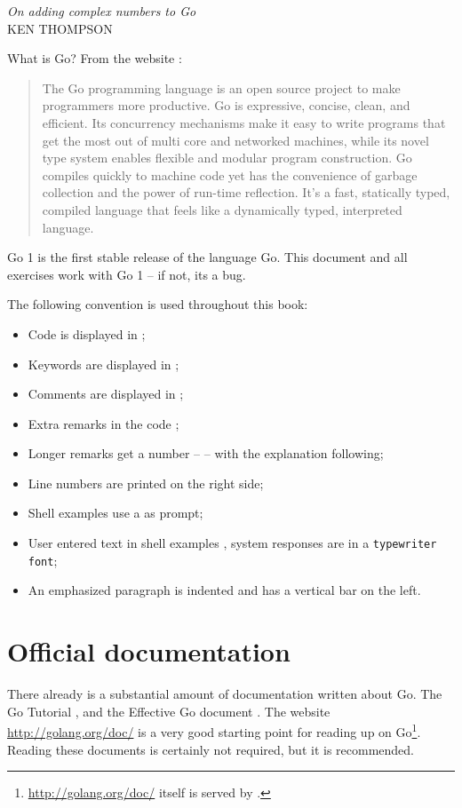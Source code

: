 {\textit{On adding complex numbers to Go}\\ \textsc{KEN THOMPSON}}

\noindent{}What is Go? From the website \cite{go_web}:
\begin{quote}
The Go programming language is an open source project to make
programmers more productive. Go is expressive, concise, clean, and
efficient. Its concurrency mechanisms make it easy to write programs
that get the most out of multi core and networked machines, while its
novel type system enables flexible and modular program construction. Go
compiles quickly to machine code yet has the convenience of garbage
collection and the power of run-time reflection. It's a fast, statically
typed, compiled language that feels like a dynamically typed,
interpreted language.
\end{quote}

Go 1 is the first stable release of the language Go. 
This document and all exercises work with Go 1 -- if not, its
a bug.

The following convention is used throughout this book:
\begin{itemize}
\item Code is displayed in ;
\item Keywords are displayed in ;
\item Comments are displayed in ;
\item Extra remarks in the code ;
\item Longer remarks get a number --  -- with the explanation following;
\item Line numbers are printed on the right side;
\item Shell examples use a \pr{} as prompt;
\item User entered text in shell examples \texttt{}, system responses
are in a \texttt{typewriter font};
\item An emphasized paragraph is indented and has a vertical bar on the
left.
\end{itemize}

\section{Official documentation}
There already is a substantial amount of documentation written about Go.
The Go Tutorial \cite{go_tutorial}, and the Effective Go
document \cite{effective_go}. The
website \url{http://golang.org/doc/} is a very good starting point
for reading up on Go\footnote{\url{http://golang.org/doc/} itself is served by 
.}. Reading these documents is
certainly not required, but it is recommended.

